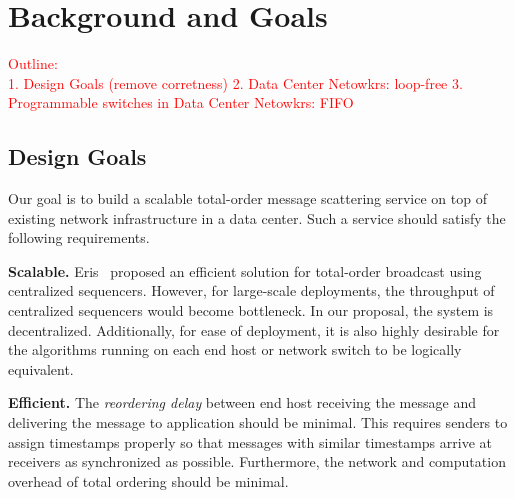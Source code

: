 \section{Background and Goals}
\textcolor{red}{Outline:\\
1. Design Goals (remove corretness)
2. Data Center Netowkrs: loop-free
3. Programmable switches in Data Center Netowkrs: FIFO
}
\label{sec:background}


\subsection{Design Goals}
\label{sec:goals}

Our goal is to build a scalable total-order message scattering service on top of existing network infrastructure in a data center.
Such a service should satisfy the following requirements.


\textbf{Scalable.}
Eris~\cite{eris} proposed an efficient solution for total-order  broadcast using centralized sequencers.
However, for large-scale deployments, the throughput of centralized sequencers would become bottleneck.
In our proposal, the system is decentralized.
Additionally, for ease of deployment, it is also highly desirable for the algorithms running on each end host or network switch to be logically equivalent.

\textbf{Efficient.}
The \textit{reordering delay} between end host receiving the message and delivering the message to application should be minimal.
This requires senders to assign timestamps properly so that messages with similar timestamps arrive at receivers as synchronized as possible.
Furthermore, the network and computation overhead of total ordering should be minimal.




